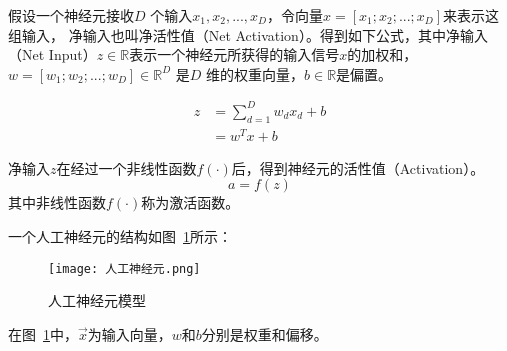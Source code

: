 假设一个神经元接收$𝐷$ 个输入$x_1,x_2,...,x_D$，令向量$x=[x_1;x_2;...;x_D]$来表示这组输入， 净输入也叫净活性值（Net Activation）。得到如下公式，其中净输入（Net Input）$z\in \mathbb{R}$表示一个神经元所获得的输入信号$x$的加权和，$w=[w_1;w_2;...;w_D] \in \mathbb{R}^D$ 是$𝐷$ 维的权重向量，$b\in \mathbb{R}$是偏置。

\begin{equation}
\begin{aligned}    
    z &= \sum_{d=1}^D w_d x_d + b \\
      &= w^Tx + b        
\end{aligned}    
\end{equation}



净输入$𝑧$在经过一个非线性函数$f(\cdot)$后，得到神经元的活性值（Activation）。
\begin{equation}
    a = f(z)
\end{equation}
其中非线性函数$f(\cdot)$称为激活函数。

一个人工神经元的结构如图~\ref{fig:神经元}所示：
\begin{figure}
    \centering
    \texttt{[image: 人工神经元.png]}
    \caption{人工神经元模型}
    \label{fig:神经元}
  \end{figure}

在图~\ref{fig:神经元}中，$\vec{x}$为输入向量，$w$和$b$分别是权重和偏移。

